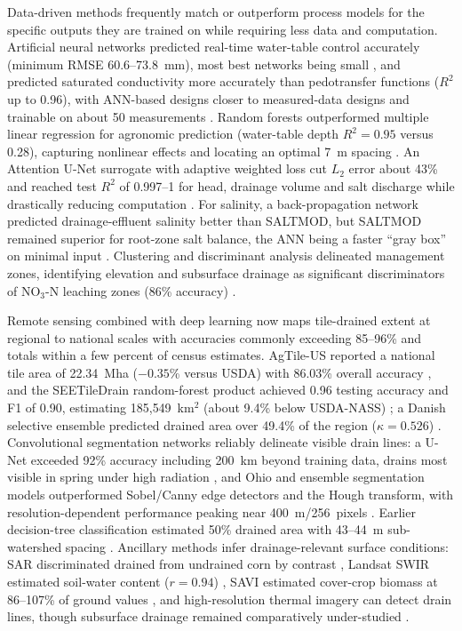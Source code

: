 \documentclass[11pt]{article}
\begin{document}
Data-driven methods frequently match or outperform process models for the specific outputs they are trained on while requiring less data and computation. Artificial neural networks predicted real-time water-table control accurately (minimum RMSE 60.6--73.8~mm), most best networks being small \parencite{Yang2000}, and predicted saturated conductivity more accurately than pedotransfer functions ($R^2$ up to 0.96), with ANN-based designs closer to measured-data designs and trainable on about 50 measurements \parencite{Ellafi2021}. Random forests outperformed multiple linear regression for agronomic prediction (water-table depth $R^2=0.95$ versus 0.28), capturing nonlinear effects and locating an optimal 7~m spacing \parencite{Djiemon2019}. An Attention U-Net surrogate with adaptive weighted loss cut $L_2$ error about 43\% and reached test $R^2$ of 0.997--1 for head, drainage volume and salt discharge while drastically reducing computation \parencite{Lei2026}. For salinity, a back-propagation network predicted drainage-effluent salinity better than SALTMOD, but SALTMOD remained superior for root-zone salt balance, the ANN being a faster ``gray box'' on minimal input \parencite{Sarangi2006}. Clustering and discriminant analysis delineated management zones, identifying elevation and subsurface drainage as significant discriminators of NO$_3$-N leaching zones (86\% accuracy) \parencite{Bakhsh2005b,Bakhsh2007b}.

Remote sensing combined with deep learning now maps tile-drained extent at regional to national scales with accuracies commonly exceeding 85--96\% and totals within a few percent of census estimates. AgTile-US reported a national tile area of 22.34~Mha ($-0.35$\% versus USDA) with 86.03\% overall accuracy \parencite{Valayamkunnath2020}, and the SEETileDrain random-forest product achieved 0.96 testing accuracy and F1 of 0.90, estimating 185{,}549~km$^2$ (about 9.4\% below USDA-NASS) \parencite{Wan2024}; a Danish selective ensemble predicted drained area over 49.4\% of the region ($\kappa=0.526$) \parencite{Moller2018}. Convolutional segmentation networks reliably delineate visible drain lines: a U-Net exceeded 92\% accuracy including 200~km beyond training data, drains most visible in spring under high radiation \parencite{Redoloza2023}, and Ohio and ensemble segmentation models outperformed Sobel/Canny edge detectors and the Hough transform, with resolution-dependent performance peaking near 400~m/256~pixels \parencite{Song2021,Woo2023}. Earlier decision-tree classification estimated 50\% drained area with 43--44~m sub-watershed spacing \parencite{Naz2009}. Ancillary methods infer drainage-relevant surface conditions: SAR discriminated drained from undrained corn by contrast \parencite{Meunier2001}, Landsat SWIR estimated soil-water content ($r=0.94$) \parencite{Rijal2013}, SAVI estimated cover-crop biomass at 86--107\% of ground values \parencite{Xu2018}, and high-resolution thermal imagery can detect drain lines, though subsurface drainage remained comparatively under-studied \parencite{Khanal2020,Zhang2010}.
\end{document}
